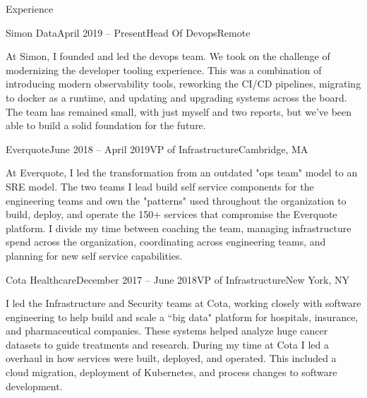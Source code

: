 \documentclass{resume} %
\begin{document}

\begin{rSection}{Experience}
\begin{rSubsection}{Simon Data}{April 2019 -- Present}{Head Of Devops}{Remote}

\item[] At Simon, I founded and led the devops team.  We took on the challenge of modernizing the developer tooling experience.  This was a combination of introducing modern observability tools, reworking the CI/CD pipelines, migrating to docker as a runtime, and updating and upgrading systems across the board.  The team has remained small, with just myself and two reports, but we've been able to build a solid foundation for the future.

\end{rSubsection}

\begin{rSubsection}{Everquote}{June 2018 -- April 2019}{VP of Infrastructure}{Cambridge, MA}

\item[] At Everquote, I led the transformation from an outdated "ops team" model to an
  SRE model.  The two teams I lead build self service components for the engineering
  teams and own the "patterns" used throughout the organization to build, deploy, and
  operate the 150+ services that compromise the Everquote platform.  I divide my time
  between coaching the team, managing infrastructure spend across the
  organization, coordinating across engineering teams, and planning for new
  self service capabilities.

\end{rSubsection}

\begin{rSubsection}{Cota Healthcare}{December 2017 -- June 2018}{VP of Infrastructure}{New York, NY}
\item[] I led the Infrastructure and Security teams at Cota, working closely with
  software engineering to help build and scale a ``big data" platform for hospitals,
  insurance, and pharmaceutical companies.  These systems helped analyze huge cancer
  datasets to guide treatments and research.  During my time at Cota I led a overhaul
  in how services were built, deployed, and operated.  This included a cloud migration,
  deployment of Kubernetes, and process changes to software development.


\end{rSubsection}
\end{rSection}
\end{document}
